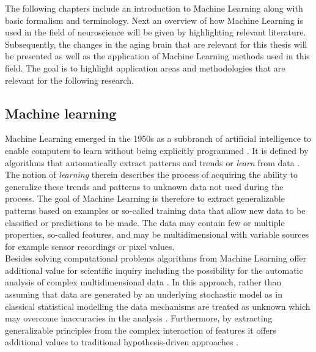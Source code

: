 The following chapters include an introduction to Machine Learning along with basic formalism and terminology. Next an overview of how Machine Learning is used in the field of neuroscience will be given by highlighting relevant literature. Subsequently, the changes in the aging brain that are relevant for this thesis will be presented as well as the application of Machine Learning methods used in this field. The goal is to highlight application areas and methodologies that are relevant for the following research.  

\subsection{Machine learning}
\label{subsec:ML}
Machine Learning emerged in the 1950s as a subbranch of artificial intelligence to enable computers to learn without being explicitly programmed \cite{Samual1959}. It is defined by algorithms that automatically extract patterns and trends or \textit{learn} from data \cite{Hastie2009}. The notion of \textit{learning} therein describes the process of acquiring the ability to generalize these trends and patterns to unknown data not used during the process. The goal of Machine Learning is therefore to extract generalizable patterns based on examples or so-called training data that allow new data to be classified or predictions to be made. The data may contain few or multiple properties, so-called features, and may be multidimensional with variable sources for example sensor recordings or pixel values.\\ 
Besides solving computational problems algorithms from Machine Learning offer additional value for scientific inquiry including the possibility for the automatic analysis of complex multidimensional data \cite{Brunton2019,Breiman2001}. In this approach, rather than assuming that data are generated by an underlying stochastic model as in classical statistical modelling the data mechanisms are treated as unknown which may overcome inaccuracies in the analysis \cite{Breiman2001}. Furthermore, by extracting generalizable principles from the complex interaction of features it offers additional values to traditional hypothesis-driven approaches \cite{Vu1601,Bzdok2017}. \medskip\\
